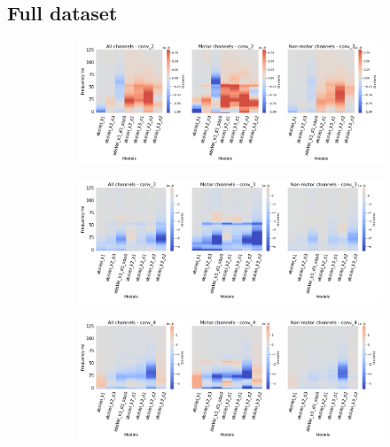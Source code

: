 \subsection*{Full dataset}\label{subsec:absVel-full-dataset-appendixB}
\begin{figure}[!htpb]
\centering
\begin{subfigure}[b]{\textwidth}
   \includegraphics[width=1\linewidth]{img/appendix/A/conv-2/sm/absVel-model-gradients-all_kinds}
   \caption{}
   \label{fig:absVel-shifted-grads-conv-2}
\end{subfigure}

\begin{subfigure}[b]{\textwidth}
   \includegraphics[width=1\linewidth]{img/appendix/A/conv-3/sm/absVel-model-gradients-all_kinds}
   \caption{}
   \label{fig:absVel-shifted-grads-conv-3}
\end{subfigure}

\begin{subfigure}[b]{\textwidth}
   \includegraphics[width=1\linewidth]{img/appendix/A/conv-4/sm/absVel-model-gradients_all_kinds}
   \caption{}
   \label{fig:absVel-shifted-grads-conv-4}
\end{subfigure}


\end{figure}
